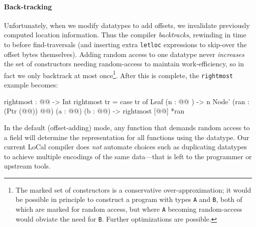 \documentclass[showabstract,showacknowledgments,showpreface,showdedication]{iuphd}
\theoremstyle{nonumberplain}
\newcommand{\il}[1]{\lstinline[style=inline,mathescape=true];#1;}
\begin{document}

\paragraph{Back-tracking}
%
Unfortunately, when we modify datatypes to add offsets, we invalidate
previously computed location information.  Thus the compiler {\em backtracks},
rewinding in time to before find-traversals (and inserting extra \il{letloc}
expressions to skip-over the offset bytes themselves).
%
Adding random access to one datatype never \emph{increases} the set of
constructors needing random-access to maintain work-efficiency, so in fact we
only backtrack at most once\footnote{The marked set of constructors
  is a conservative over-approximation; it would be possible in principle to
  construct a program with types \il{A} and \il{B}, both of which are marked for
  random access, but where \il{A} becoming random-access would obviate the need
  for \il{B}.  Further optimizations are possible.}.
%
%
After this is complete, the \il{rightmost} example becomes:
%
\begin{code}
rightmost : @@ -> Int
rightmost tr =
 case tr of
   Leaf (n : @@ ) -> n
   Node' (ran : (Ptr (@@)) @@)
         (a : @@) (b : @@)
      -> rightmost [@@] *ran
\end{code}


%
In the default (offset-adding) mode, any function that demands random access to
a field will determine the representation for all functions using the
datatype.
%
Our current LoCal compiler does \emph{not} automate choices such as duplicating
datatypes to achieve multiple encodings of the same data---that is left to the
programmer or upstream tools.
\end{document}
